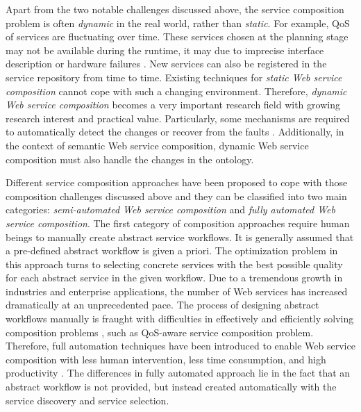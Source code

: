 Apart from the two notable challenges discussed above, the service composition problem is often \emph{dynamic} in the real world, rather than \emph{static}. For example, QoS of services are fluctuating over time. These services chosen at the planning stage may not be available during the runtime, it may due to imprecise interface description \cite{ishikawa2011bridging} or hardware failures \cite{guinard2009discovery}. New services can also be registered in the service repository from time to time. Existing techniques for \emph{static Web service composition} cannot cope with such a changing environment. Therefore, \emph{dynamic Web service composition} becomes a very important research field with growing research interest and practical value. Particularly, some mechanisms are required to automatically detect the changes or recover from the faults \cite{chan2009fault}. Additionally, in the context of semantic Web service composition, dynamic Web service composition must also handle the changes in the ontology.


Different service composition approaches \cite{da2016genetic,da2016particle,gupta2015optimization,lecue2009optimizing,ma2015hybrid,qi2010combining,rodriguez2010composition,wang2014automated,yu2013adaptive} have been proposed to cope with those composition challenges discussed above and they can be classified into two main categories: \emph{semi-automated Web service composition} and \emph{fully automated Web service composition}. The first category of composition approaches require human beings to manually create abstract service workflows. It is generally assumed that a pre-defined abstract workflow is given a priori. The optimization problem in this approach turns to selecting concrete services with the best possible quality for each abstract service in the given workflow. Due to a tremendous growth in industries and enterprise applications, the number of Web services has increased dramatically at an unprecedented pace. The process of designing abstract workflows  manually is fraught with difficulties in effectively and efficiently solving composition problems \cite{lecue2009optimizing}, such as QoS-aware service composition problem. Therefore, full automation techniques have been introduced to enable Web service composition with less human intervention, less time consumption, and high productivity \cite{rao2004survey}. The differences in fully automated approach lie in the fact that an abstract workflow is not provided, but instead created automatically with the service discovery and service selection. 


